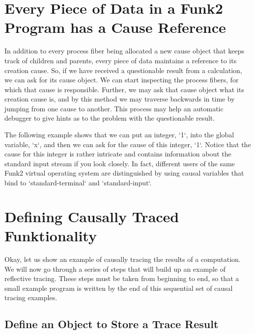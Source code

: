 \section{Every Piece of Data in a Funk2 Program has a Cause Reference}

In addition to every process fiber being allocated a new cause object
that keeps track of children and parents, every piece of data
maintains a reference to its creation cause.  So, if we have received
a questionable result from a calculation, we can ask for its cause
object.  We can start inspecting the process fibers, for which that
cause is responsible.  Further, we may ask that cause object what its
creation cause is, and by this method we may traverse backwards in
time by jumping from one cause to another.  This process may help an
automatic debugger to give hints as to the problem with the
questionable result.

The following example shows that we can put an integer, `1`, into the
global variable, `x`, and then we can ask for the cause of this
integer, `1`.  Notice that the cause for this integer is rather
intricate and contains information about the standard input stream if
you look closely.  In fact, different users of the same Funk2 virtual
operating system are distinguished by using causal variables that bind
to `standard-terminal` and `standard-input`.

%
%
%
%
%

\section{Defining Causally Traced Funktionality}

Okay, let us show an example of causally tracing the results of a
computation.  We will now go through a series of steps that will build
up an example of reflective tracing.  These steps must be taken from
beginning to end, so that a small example program is written by the
end of this sequential set of causal tracing examples.

\subsection{Define an Object to Store a Trace Result}

